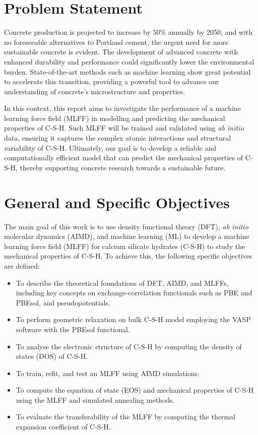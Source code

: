 \section{Problem Statement}
Concrete production is projected to increase by 50\% annually by 2050\supercite{Monteiro2017}, and with no foreseeable alternatives to Portland cement, the urgent need for more sustainable concrete is evident. The development of advanced concrete with enhanced durability and performance could significantly lower the environmental burden. State-of-the-art methods such as machine learning show great potential to accelerate this transition, providing a powerful tool to advance our understanding of concrete's microstructure and properties. 

In this context, this report aims to investigate the performance of a machine learning force field (MLFF) in modelling and predicting the mechanical properties of C-S-H. Such MLFF will be trained and validated
using \emph{ab initio} data, ensuring it captures the complex atomic interactions and structural variability of C-S-H. Ultimately, our goal is to develop a reliable and computationally efficient model that can predict the mechanical properties of C-S-H, thereby supporting concrete research towards a sustainable future.

\section{General and Specific Objectives}
The main goal of this work is to use density functional theory (DFT), \emph{ab initio} molecular dynamics (AIMD), and machine learning (ML) to
develop a machine learning force field (MLFF) for calcium silicate hydrates (C-S-H) to study the mechanical properties of C-S-H. To achieve this, the following specific objectives are defined:
\begin{itemize}
    \item To describe the theoretical foundations of DFT, AIMD, and MLFFs, including key concepts on exchange-correlation functionals such as PBE and PBEsol, and pseudopotentials. 
    \item To perform geometric relaxation on bulk C-S-H model employing the VASP software with the PBEsol functional.
    \item To analyse the electronic structure of C-S-H by computing the density of states (DOS) of C-S-H.
    \item To train, refit, and test an MLFF using AIMD simulations. 
    \item To compute the equation of state (EOS) and mechanical properties of C-S-H using the MLFF and simulated annealing methods.
    \item To evaluate the transferability of the MLFF by computing the thermal expansion coefficient of C-S-H. 
\end{itemize}

